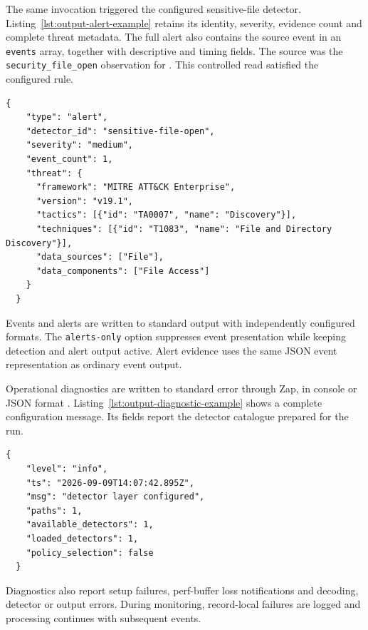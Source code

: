   The same invocation triggered the configured sensitive-file detector.
  Listing~\ref{lst:output-alert-example} retains its identity, severity, evidence
  count and complete threat metadata. The full alert also contains the source
  event in an \texttt{events} array, together with descriptive and timing fields.
  The source was the \texttt{security\_file\_open} observation for
  . This controlled read satisfied the configured rule.

  \begin{lstlisting}[language={},
      caption={Selected alert fields, including the complete threat block.},
      label={lst:output-alert-example}]
  {
    "type": "alert",
    "detector_id": "sensitive-file-open",
    "severity": "medium",
    "event_count": 1,
    "threat": {
      "framework": "MITRE ATT&CK Enterprise",
      "version": "v19.1",
      "tactics": [{"id": "TA0007", "name": "Discovery"}],
      "techniques": [{"id": "T1083", "name": "File and Directory Discovery"}],
      "data_sources": ["File"],
      "data_components": ["File Access"]
    }
  }
  \end{lstlisting}

  Events and alerts are written to standard output with independently configured
  formats. The \texttt{alerts-only} option suppresses event presentation while
  keeping detection and alert output active. Alert evidence uses the same JSON
  event representation as ordinary event output.

  Operational diagnostics are written to standard error through Zap, in console
  or JSON format \cite{uber_zap}. Listing~\ref{lst:output-diagnostic-example}
  shows a complete configuration message. Its fields report the detector
  catalogue prepared for the run.

  \begin{lstlisting}[language={},
      caption={Recorded diagnostic describing detector configuration.},
      label={lst:output-diagnostic-example}]
  {
    "level": "info",
    "ts": "2026-09-09T14:07:42.895Z",
    "msg": "detector layer configured",
    "paths": 1,
    "available_detectors": 1,
    "loaded_detectors": 1,
    "policy_selection": false
  }
  \end{lstlisting}

  Diagnostics also report setup failures, perf-buffer loss notifications and
  decoding, detector or output errors. During monitoring, record-local failures are logged
  and processing continues with subsequent events.

%
%
